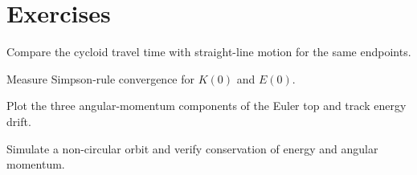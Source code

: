 \section{Exercises}
\begin{exercise}
Compare the cycloid travel time with straight-line motion for the same endpoints.
\end{exercise}
\begin{exercise}
Measure Simpson-rule convergence for $K(0)$ and $E(0)$.
\end{exercise}
\begin{exercise}
Plot the three angular-momentum components of the Euler top and track energy drift.
\end{exercise}
\begin{exercise}
Simulate a non-circular orbit and verify conservation of energy and angular momentum.
\end{exercise}
